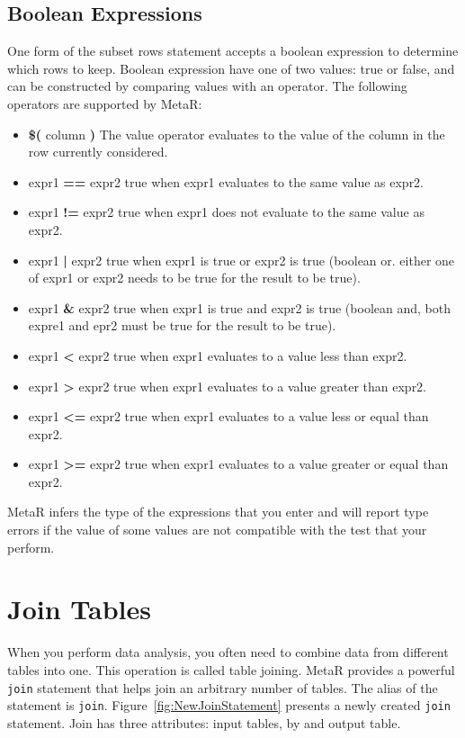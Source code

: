 \subsection{Boolean Expressions}
One form of the subset rows statement accepts a boolean expression to determine which rows to keep. Boolean expression have one of two values: true or false, and can be constructed by comparing values with an operator. The following operators are supported by MetaR:
\begin{itemize}
 \item \textbf{\$(} column \textbf{)} The value operator evaluates to the value of the column in the row currently considered.
	\item expr1 \textbf{==} expr2 true when expr1 evaluates to the same value as expr2.
	\item expr1 \textbf{!=} expr2 true when expr1 does not evaluate to the same value as expr2.
	\item expr1 \textbf{|} expr2 true when expr1 is true or expr2 is true (boolean or. either one of expr1 or expr2 needs to be true for the result to be true).
    \item expr1 \textbf{\&} expr2 true when expr1 is true and expr2 is true (boolean and, both expre1 and epr2 must be true for the result to be true).
    \item expr1 \textbf{<} expr2 true when expr1 evaluates to a value less than expr2.  
    \item expr1 \textbf{>} expr2 true when expr1 evaluates to a value greater than expr2.  
   \item expr1 \textbf{<=} expr2 true when expr1 evaluates to a value less or equal than expr2.  
    \item expr1 \textbf{>=} expr2 true when expr1 evaluates to a value greater or equal than expr2.  
\end{itemize}

\begin{remark}
MetaR infers the type of the expressions that you enter and will report type errors if the value of some values are not compatible with the test that your perform.
\end{remark}


\section{Join Tables}
When you perform data analysis, you often need to combine data from different tables into one. This operation is called table joining. MetaR provides a powerful \texttt{join} statement that helps join an arbitrary number of tables. The alias of the statement is \texttt{join}. Figure~\ref{fig:NewJoinStatement} presents a newly created \texttt{join} statement. Join has three attributes: input tables, by and output table.

